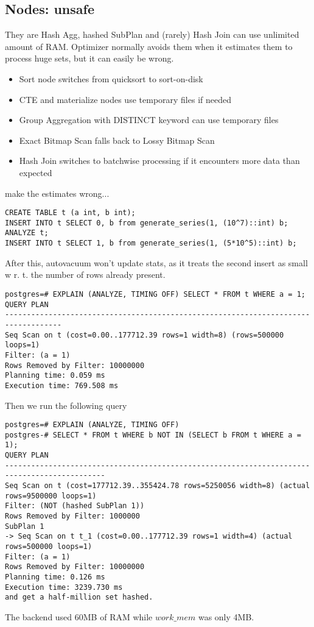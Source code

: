 \documentclass[paper=letter, fontsize=12pt]{article}
\begin{document}
\subsection{Nodes: unsafe}
They are Hash Agg, hashed SubPlan and (rarely) Hash Join can use unlimited amount of RAM.
Optimizer normally avoids them when it estimates them to process huge sets, but it can easily be wrong.
	\begin{itemize}
		\item Sort node switches from quicksort to sort-on-disk
		\item CTE and materialize nodes use temporary files if needed
		\item Group Aggregation with DISTINCT keyword can use temporary files
		\item Exact Bitmap Scan falls back to Lossy Bitmap Scan
		\item Hash Join switches to batchwise processing if it encounters more data than expected
	\end{itemize}
	make the estimates wrong...
	\begin{verbatim}
CREATE TABLE t (a int, b int);
INSERT INTO t SELECT 0, b from generate_series(1, (10^7)::int) b;
ANALYZE t;
INSERT INTO t SELECT 1, b from generate_series(1, (5*10^5)::int) b;
	\end{verbatim}
	After this, autovacuum won’t update stats, as it treats the second
	insert as small w r. t. the number of rows already present.
	\begin{verbatim}
postgres=# EXPLAIN (ANALYZE, TIMING OFF) SELECT * FROM t WHERE a = 1;
QUERY PLAN
-----------------------------------------------------------------------------------
Seq Scan on t (cost=0.00..177712.39 rows=1 width=8) (rows=500000 loops=1)
Filter: (a = 1)
Rows Removed by Filter: 10000000
Planning time: 0.059 ms
Execution time: 769.508 ms
	\end{verbatim}
	
	Then we run the following query
	\begin{verbatim}
postgres=# EXPLAIN (ANALYZE, TIMING OFF)
postgres-# SELECT * FROM t WHERE b NOT IN (SELECT b FROM t WHERE a = 1);
QUERY PLAN
---------------------------------------------------------------------------------------------
Seq Scan on t (cost=177712.39..355424.78 rows=5250056 width=8) (actual rows=9500000 loops=1)
Filter: (NOT (hashed SubPlan 1))
Rows Removed by Filter: 1000000
SubPlan 1
-> Seq Scan on t t_1 (cost=0.00..177712.39 rows=1 width=4) (actual rows=500000 loops=1)
Filter: (a = 1)
Rows Removed by Filter: 10000000
Planning time: 0.126 ms
Execution time: 3239.730 ms
and get a half-million set hashed.
	\end{verbatim}
	The backend used 60MB of RAM while $ work\_mem $ was only 4MB.
\end{document}
